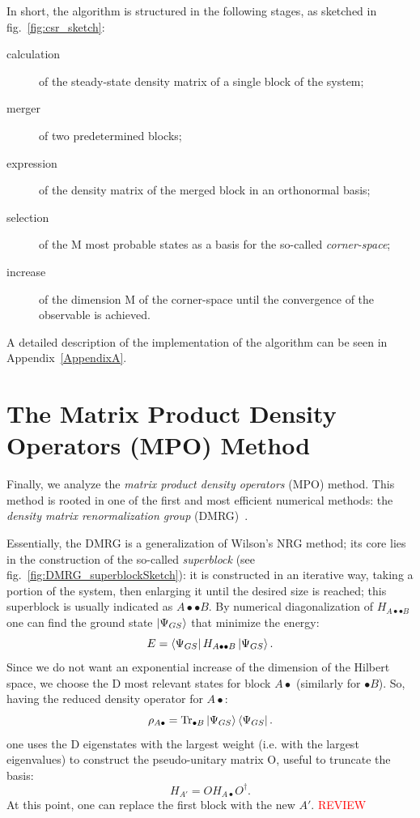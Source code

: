 \bigskip
In short, the algorithm is structured in the following stages, as sketched in fig.~\ref{fig:csr_sketch}:
\begin{description}
    \item[calculation] of the steady-state density matrix of a single block of the system;
    \item[merger] of two predetermined blocks;
    \item[expression] of the density matrix of the merged block in an orthonormal basis;
    \item[selection] of the M most probable states as a basis for the so-called \emph{corner-space};
    \item[increase] of the dimension M of the corner-space until the convergence of the observable is achieved.
\end{description}

A detailed description of the implementation of the algorithm can be seen in Appendix~\ref{AppendixA}.


\section{The Matrix Product Density Operators (MPO) Method}
Finally, we analyze the \emph{matrix product density operators} (MPO) method.
This method is rooted in one of the first and most efficient numerical methods: the \emph{density matrix renormalization group} (DMRG)~\cite{s_white:dmrg, PhysRevB.48.10345, RevModPhys.77.259}.

Essentially, the DMRG is a generalization of Wilson's NRG method; its core lies in the construction of the so-called \emph{superblock} (see fig.~\ref{fig:DMRG_superblockSketch}): it is constructed in an iterative way, taking a portion of the system, then enlarging it until the desired size is reached; this superblock is usually indicated as $A \bullet \bullet B$. By numerical diagonalization of $H_{A \bullet \bullet B}$ one can find the ground state $\ket{\Psi_{GS}}$ that minimize the energy:
\begin{equation*}
    E = \bra{\Psi_{GS}} H_{A \bullet \bullet B}\ket{\Psi_{GS}}.
\end{equation*}
Since we do not want an exponential increase of the dimension of the Hilbert space, we choose the D most relevant states for block $A \bullet$ (similarly for $\bullet B$). So, having the reduced density operator for $A \bullet$:
\begin{equation*}
    \rho_{A \bullet} = \operatorname{Tr}_{\bullet B} \ket{\Psi_{GS}}\bra{\Psi_{GS}}.
\end{equation*}
one uses the D eigenstates with the largest weight (i.e. with the largest eigenvalues) to construct the pseudo-unitary matrix O, useful to truncate the basis:
\begin{equation*}
    H_{A'} = OH_{A\bullet}O^\dagger.
\end{equation*}
At this point, one can replace the first block with the new $A'$.
\textcolor{red}{REVIEW}


